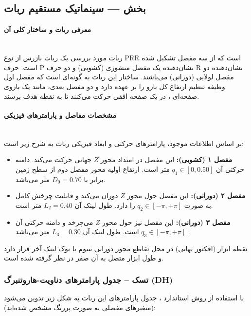 \documentclass{article}
\begin{document}
\subsection{بخش  --- سینماتیک مستقیم  ربات }

\paragraph{معرفی ربات و ساختار کلی آن}\mbox{}\\
ربات مورد بررسی یک ربات بازرس از نوع PRR است که از سه مفصل تشکیل شده است. حرف P نشان‌دهنده یک مفصل منشوری (کشویی) و دو حرف R نشان‌دهنده دو مفصل لولایی (دورانی) می‌باشند. ساختار این ربات به گونه‌ای است که مفصل اول وظیفه تنظیم ارتفاع کل بازو را بر عهده دارد و دو مفصل بعدی، مانند یک بازوی صفحه‌ای ، در یک صفحه افقی حرکت می‌کنند تا به نقطه هدف برسند.  

\paragraph{مشخصات مفاصل و پارامترهای فیزیکی}\mbox{}\\
بر اساس اطلاعات موجود، پارامترهای حرکتی و ابعاد فیزیکی ربات به شرح زیر است:
\begin{itemize}
	\item \textbf{مفصل ۱ (کشویی):} این مفصل در امتداد محور $Z$ جهانی حرکت می‌کند. دامنه حرکتی آن $q_1 \in [0, 0.50]$ متر است. ارتفاع اولیه محور مفصل دوم از سطح زمین برابر با $D_0 = 0.70$ متر می‌باشد.
	\item \textbf{مفصل ۲ (دورانی):} این مفصل حول محور $Z$ دوران می‌کند و قابلیت چرخش کامل به صورت $q_2 \in [-\pi, +\pi]$ را دارد. طول لینک آن $L_2 = 0.40$ متر است.
	\item \textbf{مفصل ۳ (دورانی):} این مفصل نیز حول محور $Z$ می‌چرخد و دامنه حرکتی آن $q_3 \in [-\pi, +\pi]$   است. طول لینک آن  $L_3 = 0.30$ متر می‌باشد .
\end{itemize}
نقطه ابزار (افکتور نهایی) در محل تقاطع محور دورانی سوم با نوک لینک آخر قرار دارد و طول ابزار متصل به آن صفر در نظر گرفته شده است.

\subsubsection{تسک  -- جدول پارامترهای دناویت-هاروتنبرگ (DH)}

با استفاده از روش استاندارد ، جدول پارامترهای این ربات به شکل زیر تدوین می‌شود (متغیرهای مفصلی به صورت پررنگ مشخص شده‌اند):
\end{document}
